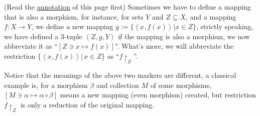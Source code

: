 \documentclass{article}
\begin{document}
\begin{Mark}
	(Read the \hyperref[sign]{annotation} of this page first) Sometimes we have to define a mapping that is also a morphism, for instance, for sets $Y$ and $Z\subseteq X$, and a mapping $f:X\to Y$, we define a new mapping $g:=\{\left<x,f(x)\right>|x\in Z\}$, strictly speaking, we have defined a 3-tuple $\left<Z,g,Y\right>$ if the mapping is also a morphism, we now abbreviate it as ``$[Z\ni x\mapsto f(x)]$''. What's more, we will abbreviate the restriction $\{\left<x,f(x)\right>|\,x\in Z\}$ as ``$f\upharpoonright_Z$''.

	Notice that the meanings of the above two markers are different, a classical example is, for a morphism $\beta$ and collection $M$ of some morphisms, $[M\ni\alpha\mapsto\alpha\circ\beta]$ means a new mapping (even morphism) created, but restriction $f\upharpoonright_Z$ is only a reduction of the original mapping.
\end{Mark}
\end{document}

